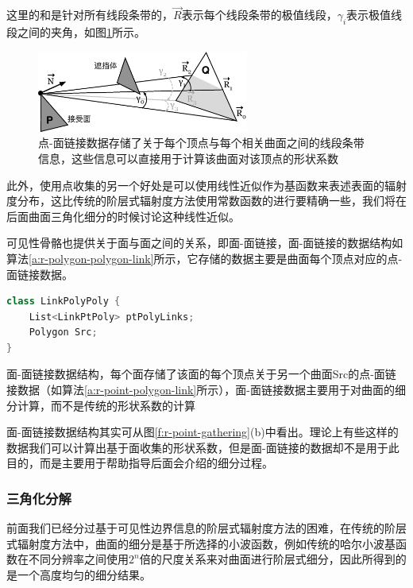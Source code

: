\noindent 这里的和是针对所有线段条带的，$\vec{R}$表示每个线段条带的极值线段，$\gamma_i$表示极值线段之间的夹角，如图\ref{f:r-point-polygon-link}所示。

\begin{figure}
	\sidecaption
	\includegraphics[width=0.62\textwidth]{figures/r/point-polygon-link}
	\caption{点-面链接数据存储了关于每个顶点与每个相关曲面之间的线段条带信息，这些信息可以直接用于计算该曲面对该顶点的形状系数}
	\label{f:r-point-polygon-link}
\end{figure}

此外，使用点收集的另一个好处是可以使用线性近似作为基函数来表述表面的辐射度分布，这比传统的阶层式辐射度方法使用常数函数的进行要精确一些，我们将在后面曲面三角化细分的时候讨论这种线性近似。

可见性骨骼也提供关于面与面之间的关系，即面-面链接，面-面链接的数据结构如算法\ref{a:r-polygon-polygon-link}所示，它存储的数据主要是曲面每个顶点对应的点-面链接数据。

\begin{algorithm}
\begin{lstlisting}[language=C++, mathescape]
class LinkPolyPoly {
	List<LinkPtPoly> ptPolyLinks;
	Polygon Src;
}
\end{lstlisting}
\caption{面-面链接数据结构，每个面存储了该面的每个顶点关于另一个曲面Src的点-面链接数据（如算法\ref{a:r-point-polygon-link}所示），面-面链接数据主要用于对曲面的细分计算，而不是传统的形状系数的计算}
\label{a:r-polygon-polygon-link}
\end{algorithm}

面-面链接数据结构其实可从图\ref{f:r-point-gathering}(b)中看出。理论上有些这样的数据我们可以计算出基于面收集的形状系数，但是面-面链接的数据却不是用于此目的，而是主要用于帮助指导后面会介绍的细分过程。




\subsubsection{三角化分解}
前面我们已经分过基于可见性边界信息的阶层式辐射度方法的困难，在传统的阶层式辐射度方法中，曲面的细分是基于所选择的小波函数，例如传统的哈尔小波基函数在不同分辨率之间使用$2^{n}$倍的尺度关系来对曲面进行阶层式细分，因此所得到的是一个高度均匀的细分结果。


